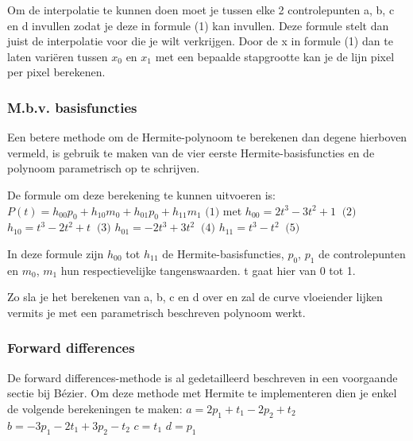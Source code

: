 \documentclass[a4paper,11pt,oneside, titlepage]{article}
\begin{document}
Om de interpolatie te kunnen doen moet je tussen elke 2 controlepunten a, b, c en d invullen
zodat je deze in formule (1) kan invullen. Deze formule stelt dan juist de interpolatie 
voor die je wilt verkrijgen. Door de x in formule (1) dan te laten vari\"eren tussen 
$x_0$ en $x_1$ met een bepaalde stapgrootte kan je de lijn pixel per pixel berekenen.
\subsubsection{M.b.v. basisfuncties}
Een betere methode om de Hermite-polynoom te berekenen dan degene hierboven vermeld, is gebruik te maken van de vier eerste Hermite-basisfuncties en de polynoom parametrisch op te schrijven.

De formule om deze berekening te kunnen uitvoeren is:\newline \newline
$P(t) = h_{00}p_0 + h_{10}m_0 + h_{01}p_0 + h_{11}m_1 \textrm{   (1)}$\newline \newline
met\newline \newline
$h_{00} = 2t^3 - 3t^2 + 1\ \textrm{   (2)}$\newline
$h_{10} = t^3 - 2t^2 + t\ \textrm{   (3)}$\newline
$h_{01} = -2t^3 + 3t^2\ \textrm{   (4)}$\newline
$h_{11} = t^3 - t^2\ \textrm{   (5)}$\newline

In deze formule zijn $h_{00}$ tot $h_{11}$ de Hermite-basisfuncties, $p_0$, $p_1$ 
de controlepunten en $m_0$, $m_1$ hun respectievelijke tangenswaarden. t gaat hier van 0 tot 1.

Zo sla je het berekenen van a, b, c en d over en zal de curve vloeiender lijken vermits je
met een parametrisch beschreven polynoom werkt.
\subsubsection{Forward differences}
De forward differences-methode is al gedetailleerd beschreven in een voorgaande
sectie bij B\'ezier. Om deze methode met Hermite te implementeren dien je enkel
de volgende berekeningen te maken:\newline \newline
$a = 2p_1 + t_1 - 2p_2 + t_2$\newline
$b = -3p_1 - 2t_1 + 3p_2 - t_2$\newline
$c = t_1$\newline
$d = p_1$\newline \newline
\end{document}

